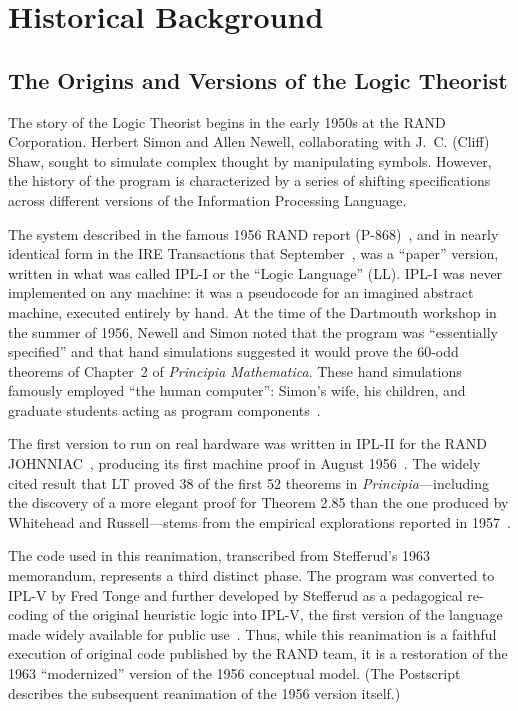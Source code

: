 \documentclass[journal]{IEEEtran}
\begin{document}
\section{Historical Background}
\label{sec:history}

\subsection{The Origins and Versions of the Logic Theorist}

The story of the Logic Theorist begins in the early 1950s at the RAND
Corporation. Herbert Simon and Allen Newell, collaborating with
J.~C. (Cliff) Shaw, sought to simulate complex thought by manipulating
symbols. However, the history of the program is characterized by a
series of shifting specifications across different versions of the
Information Processing Language.

The system described in the famous 1956 RAND report
(P-868)~\cite{LT1956a}, and in nearly identical form in the IRE
Transactions that September~\cite{LT1956b}, was a ``paper'' version,
written in what was called IPL-I or the ``Logic Language'' (LL).
IPL-I was never implemented on any machine: it was a pseudocode for an
imagined abstract machine, executed entirely by hand. At the time of
the Dartmouth workshop in the summer of 1956, Newell and Simon noted
that the program was ``essentially specified'' and that hand
simulations suggested it would prove the 60-odd theorems of Chapter~2
of \textit{Principia Mathematica}. These hand simulations famously
employed ``the human computer'': Simon's wife, his children, and
graduate students acting as program
components~\cite[Ch.~13]{simon1996models}.

The first version to run on real hardware was written in IPL-II for
the RAND JOHNNIAC~\cite{gruenberger1968johnniac,newellshaw1957},
producing its first machine proof in August
1956~\cite{simon1996models,newellshaw1957}. The widely cited result
that LT proved 38 of the first 52 theorems in
\textit{Principia}---including the discovery of a more elegant proof
for Theorem 2.85 than the one produced by Whitehead and
Russell---stems from the empirical explorations reported in
1957~\cite{LT1957}.

The code used in this reanimation, transcribed from Stefferud's 1963
memorandum, represents a third distinct phase. The program was
converted to IPL-V by Fred Tonge and further developed by Stefferud as
a pedagogical re-coding of the original heuristic logic into IPL-V,
the first version of the language made widely available for public
use~\cite{stefferud1963lt}. Thus, while this reanimation is a faithful
execution of original code published by the RAND team, it is a
restoration of the 1963 ``modernized'' version of the 1956 conceptual
model. (The Postscript describes the subsequent reanimation of the
1956 version itself.)
\end{document}

